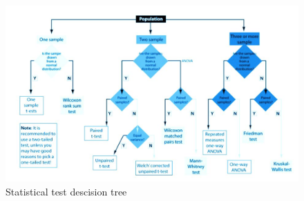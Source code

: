 \documentclass[a4paper,11pt,twoside]{article}
\begin{document}
\begin{figure}[h]%
 \centering
 \includegraphics[width=15cm]{./pic/choose_test}
 \caption{\label{pic:testtree} Statistical test descision tree}
\end{figure}
\end{document}
